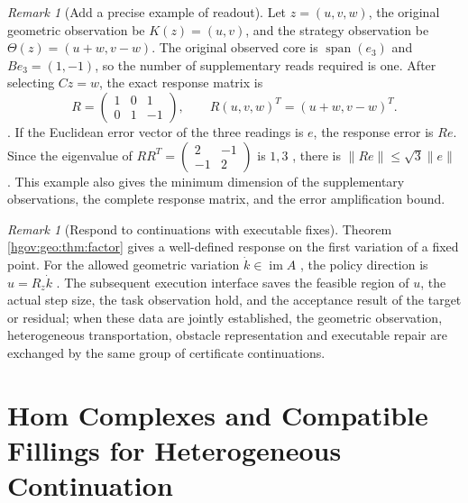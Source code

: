 \documentclass[12pt,a4paper,openany,notitlepage]{report}
\theoremstyle{plain}
\theoremstyle{definition}
\theoremstyle{remark}
\newtheorem{remark}[theorem]{Remark}
\def\mathcal#1{#1}\def\mathsf#1{#1}\def\mathbb#1{#1}%
\begin{document}
\begin{CJK*}
\begin{remark}
[Add a precise example of readout]Let $z=(u,v,w)$, the original geometric observation be $\mathcal K(z)=(u,v)$, and the strategy observation be $\Theta(z)=(u+w,v-w)$. The original observed core is $\operatorname{span}(e_3)$ and $Be_3=(1,-1)$, so the number of supplementary reads required is one. After selecting $Cz=w$, the exact response matrix is \[
R=\begin{pmatrix}1&0&1\\0&1&-1\end{pmatrix},
\qquad R(u,v,w)^{\mathsf T}=(u+w,v-w)^{\mathsf T}.
\]. If the Euclidean error vector of the three readings is $e$, the response error is $Re$. Since the eigenvalue of $RR^{\mathsf T}=\begin{pmatrix}2&-1\\-1&2\end{pmatrix}$ is $1,3$ , there is $\lVert Re\rVert\le\sqrt3\lVert e\rVert$ . This example also gives the minimum dimension of the supplementary observations, the complete response matrix, and the error amplification bound.\end{remark}


\begin{remark}
[Respond to continuations with executable fixes]Theorem ~ \ref{hgov:geo:thm:factor} gives a well-defined response on the first variation of a fixed point. For the allowed geometric variation $\dot k\in\operatorname{im}A$ , the policy direction is $u=\mathcal R_z\dot k$ . The subsequent execution interface saves the feasible region of $u$, the actual step size, the task observation hold, and the acceptance result of the target or residual; when these data are jointly established, the geometric observation, heterogeneous transportation, obstacle representation and executable repair are exchanged by the same group of certificate continuations.\end{remark}





\chapter{Hom Complexes and Compatible Fillings for Heterogeneous Continuation}
\label{exp:ch:hom}



\end{CJK*}
\end{document}
